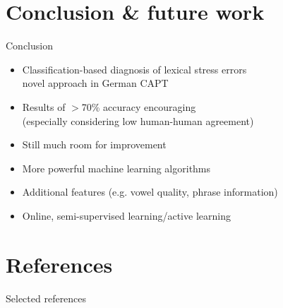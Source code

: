 \documentclass[xcolor={dvipsnames}]{beamer}
\renewcommand{\footnotesize}{\scriptsize}
\begin{document}
\section{Conclusion \& future work}
\begin{frame}{Conclusion}

\begin{itemize}
	\item{Classification-based diagnosis of lexical stress errors\\novel approach in German CAPT}
	\item{Results of $>$70\% accuracy encouraging\\
	(especially considering low human-human agreement)}
	\item{Still much room for improvement}
\end{itemize}
\vfill
{}
\begin{itemize}
	\item{More powerful machine learning algorithms}
	\item{Additional features (e.g. vowel quality, phrase information)}
	\item{Online, semi-supervised learning/active learning}
\end{itemize}

\end{frame}

\section{References}
\begin{frame}[noframenumbering]{Selected references}
\renewcommand*{\bibfont}{\footnotesize}
    \printbibliography

\end{frame}
\end{document}
